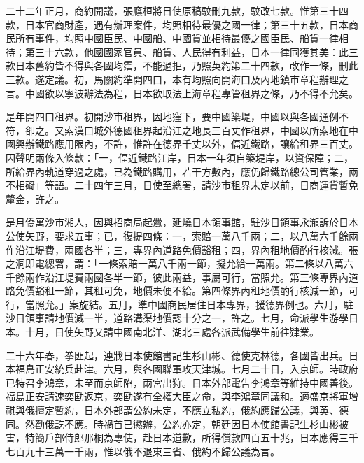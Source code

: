 \begin{pinyinscope}
二十二年正月，商約開議，張廕桓將日使原稿駮刪九款，駮改七款。惟第三十四款，日本官商財產，遇有辦理案件，均照相待最優之國一律；第三十五款，日本商民所有事件，均照中國臣民、中國船、中國貨並相待最優之國臣民、船貨一律相待；第三十六款，他國國家官員、船貨、人民得有利益，日本一律同獲其美：此三款日本舊約皆不得與各國均霑，不能過拒，乃照英約第二十四款，改作一條，刪此三款。遂定議。初，馬關約準開四口，本有均照向開海口及內地鎮市章程辦理之言。中國欲以寧波辦法為程，日本欲取法上海章程專管租界之條，乃不得不允矣。

是年開四口租界。初開沙市租界，因地窪下，要中國築堤，中國以與各國通例不符，卻之。又索漢口城外德國租界起沿江之地長三百丈作租界，中國以所索地在中國興辦鐵路應用限內，不許，惟許在德界千丈以外，偪近鐵路，讓給租界三百丈。因聲明兩條入條款：「一，偪近鐵路江岸，日本一年須自築堤岸，以資保障；二，所給界內軌道穿過之處，已為鐵路購用，若干方數內，應仍歸鐵路總公司管業，兩不相礙」等語。二十四年三月，日使至總署，請沙市租界未定以前，日商運貨暫免釐金，許之。

是月僑寓沙市湘人，因與招商局起釁，延燒日本領事館，駐沙日領事永瀧訴於日本公使矢野，要求五事；已，復提四條：一，索賠一萬八千兩；二，以八萬六千餘兩作沿江堤費，兩國各半；三，專界內道路免價豁租；四，界內租地價酌行核減。張之洞即電總署，謂：「一條索賠一萬八千兩一節，擬允給一萬兩。第二條以八萬六千餘兩作沿江堤費兩國各半一節，彼此兩益，事屬可行，當照允。第三條專界內道路免價豁租一節，其租可免，地價未便不給。第四條界內租地價酌行核減一節，可行，當照允。」案旋結。五月，準中國商民居住日本專界，援德界例也。六月，駐沙日領事請地價減一半，道路溝渠地價認十分之一，許之。七月，命派學生游學日本。十月，日使矢野又請中國南北洋、湖北三處各派武備學生前往肄業。

二十六年春，拳匪起，連戕日本使館書記生杉山彬、德使克林德，各國皆出兵。日本福島正安統兵赴津。六月，與各國聯軍攻天津城。七月二十日，入京師。時政府已特召李鴻章，未至而京師陷，兩宮出狩。日本外部電告李鴻章等維持中國善後。福島正安請速奕劻返京，奕劻遂有全權大臣之命，與李鴻章同議和。適盛京將軍增祺與俄擅定暫約，日本外部謂公約未定，不應立私約，俄約應歸公議，與英、德同。然勸俄訖不應。時禍首已懲辦，公約亦定，朝廷因日本使館書記生杉山彬被害，特簡戶部侍郎那桐為專使，赴日本道歉，所得償款四百五十兆，日本應得三千七百九十三萬一千兩，惟以俄不退東三省、俄約不歸公議為言。


\end{pinyinscope}
